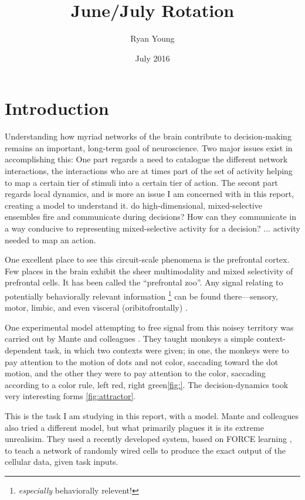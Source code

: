 \documentclass{journal}
\title{June/July Rotation}
\author{Ryan Young}
\date{July 2016}
\begin{document}
\maketitle

\section{Introduction}

Understanding how myriad networks of the brain contribute to decision-making remains an important, long-term goal of neuroscience. Two major issues exist in accomplishing this: One part regards a need to catalogue the different network interactions, the interactions who are at times part of the set of activity helping to map a certain tier of stimuli into a certain tier of action. The secont part regards local dynamics, and is more an issue I am concerned with in this report, creating a model to understand it.  do high-dimensional, mixed-selective ensembles fire and communicate during decisions? How can they communicate in a way conducive to representing mixed-selective activity for a decision? ... activity needed to map an action.

One excellent place to see this circuit-scale phenomena is the prefrontal cortex. Few places in the brain exhibit the sheer multimodality and mixed selectivity of prefrontal cells. It has been called the ``prefrontal zoo''. Any signal relating to potentially behaviorally relevant information \footnote{\textit{especially} behaviorally relevent!} can be found there---sensory, motor, limbic, and even visceral (oribitofrontally) \cite{fuster_prefrontal_2015}.

One experimental model attempting to free signal from this noisey territory was carried out by Mante and colleagues \cite{mante_context-dependent_2013}. They taught monkeys a simple context-dependent task, in which two contexts were given; in one, the monkeys were to pay attention to the motion of dots and not color, saccading toward the dot motion, and the other they were to pay attention to the color, saccading according to a color rule, left red, right green\ref{fig:}. The decision-dynamics took very interesting forms \ref{fig:attractor}.

This is the task I am studying in this report, with a model. Mante and colleagues also tried a different model, but what primarily plagues it is its extreme unrealisim. They used a recently developed system, based on FORCE learning \cite{ABBOTT}, to teach a network of randomly wired cells to produce the exact output of the cellular data, given task inputs. 
\end{document}
